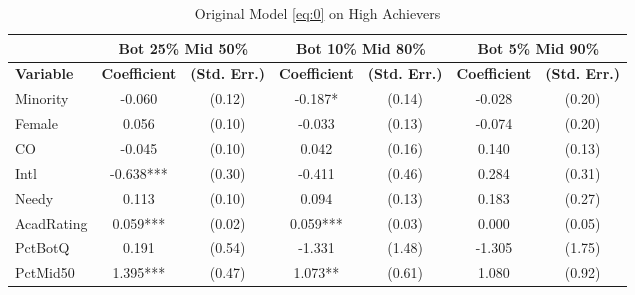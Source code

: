 \clearpage{}


\newpage{}

\begin{sidewaystable}[htb]\centering
  \begin{threeparttable}
    \caption{Original Model \eqref{eq:0} on High Achievers}\label{table:c3}
    \begin{tabular}{l|c|c|c|c|c|c}
      \hline\hline 
                        & \multicolumn{2}{|c|}{Bot 25\% Mid 50\%} & \multicolumn{2}{|c|}{Bot 10\% Mid 80\%} & \multicolumn{2}{|c}{Bot 5\% Mid 90\%} \\
      \hline
      \textbf{Variable} & \textbf{Coefficient}         & \textbf{(Std. Err.)}         & \textbf{Coefficient} & \textbf{(Std. Err.)} & \textbf{Coefficient} & \textbf{(Std. Err.)} \\ 
      \hline
      \hline 
      Minority            &      -0.060                       &      (0.12)   &      -0.187*                      &      (0.14)   &      -0.028                       &      (0.20)   \\
      Female              &       0.056                       &      (0.10)   &      -0.033                       &      (0.13)   &      -0.074                       &      (0.20)   \\
      CO                  &      -0.045                       &      (0.10)   &       0.042                       &      (0.16)   &       0.140                       &      (0.13)   \\
      Intl                &      -0.638***                    &      (0.30)   &      -0.411                       &      (0.46)   &       0.284                       &      (0.31)   \\
      Needy               &       0.113                       &      (0.10)   &       0.094                       &      (0.13)   &       0.183                       &      (0.27)   \\
      AcadRating          &       0.059***                    &      (0.02)   &       0.059***                    &      (0.03)   &       0.000                       &      (0.05)   \\
      PctBotQ             &       0.191                       &      (0.54)   &      -1.331                       &      (1.48)   &      -1.305                       &      (1.75)   \\
      PctMid50            &       1.395***                    &      (0.47)   &       1.073**                     &      (0.61)   &       1.080                       &      (0.92)   \\

\end{tabular}
\end{threeparttable}
\end{sidewaystable}
